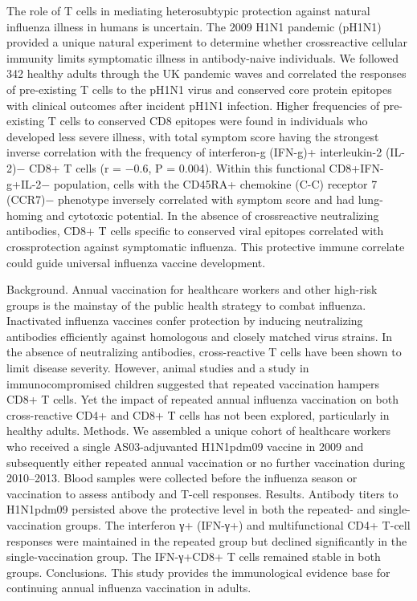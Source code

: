 \cite{bentebibelInductionICOSCXCR3}
The role of T cells in mediating heterosubtypic protection against natural
influenza illness in humans is uncertain.  The 2009 H1N1 pandemic (pH1N1)
provided a unique natural experiment to determine whether crossreactive
cellular immunity limits symptomatic illness in antibody-naive individuals. We
followed 342 healthy adults through the UK pandemic waves and correlated the
responses of pre-existing T cells to the pH1N1 virus and conserved core protein
epitopes with clinical outcomes after incident pH1N1 infection. Higher
frequencies of pre-existing T cells to conserved CD8 epitopes were found in
individuals who developed less severe illness, with total symptom score having
the strongest inverse correlation with the frequency of interferon-g (IFN-g)+
interleukin-2 (IL-2)− CD8+ T cells (r = −0.6, P = 0.004). Within this
functional CD8+IFN-g+IL-2− population, cells with the CD45RA+ chemokine (C-C)
receptor 7 (CCR7)− phenotype inversely correlated with symptom score and had
lung-homing and cytotoxic potential. In the absence of crossreactive
neutralizing antibodies, CD8+ T cells specific to conserved viral epitopes
correlated with crossprotection against symptomatic influenza. This protective
immune correlate could guide universal influenza vaccine development.

\cite{trieuLongtermMaintenanceInfluenzaSpecific2017}
Background. Annual vaccination for healthcare workers and other high-risk
groups is the mainstay of the public health strategy to combat influenza.
Inactivated influenza vaccines confer protection by inducing neutralizing
antibodies efficiently against homologous and closely matched virus strains. In
the absence of neutralizing antibodies, cross-reactive T cells have been shown
to limit disease severity. However, animal studies and a study in
immunocompromised children suggested that repeated vaccination hampers CD8+ T
cells. Yet the impact of repeated annual influenza vaccination on both
cross-reactive CD4+ and CD8+ T cells has not been explored, particularly in
healthy adults.  Methods. We assembled a unique cohort of healthcare workers
who received a single AS03-adjuvanted H1N1pdm09 vaccine in 2009 and
subsequently either repeated annual vaccination or no further vaccination
during 2010–2013. Blood samples were collected before the influenza season or
vaccination to assess antibody and T-cell responses.  Results. Antibody titers
to H1N1pdm09 persisted above the protective level in both the repeated- and
single-vaccination groups.  The interferon γ+ (IFN-γ+) and multifunctional CD4+
T-cell responses were maintained in the repeated group but declined
significantly in the single-vaccination group. The IFN-γ+CD8+ T cells remained
stable in both groups.  Conclusions. This study provides the immunological
evidence base for continuing annual influenza vaccination in adults.

